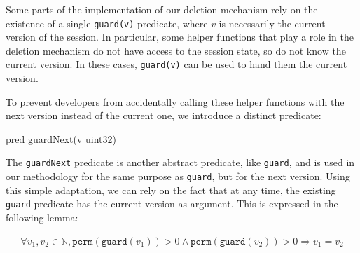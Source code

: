 Some parts of the implementation of our deletion mechanism rely on the existence of a single \texttt{guard(v)} predicate, where $v$ is necessarily the current version of the session.
In particular, some helper functions that play a role in the deletion mechanism do not have access to the session state, so do not know the current version.
In these cases, \texttt{guard(v)} can be used to hand them the current version.

To prevent developers from accidentally calling these helper functions with the next version instead of the current one, we introduce a distinct predicate:
\begin{gobra}
pred guardNext(v uint32)
\end{gobra}

The \texttt{guardNext} predicate is another abstract predicate, like \texttt{guard}, and is used in our methodology for the same purpose as \texttt{guard}, but for the next version. 
Using this simple adaptation, we can rely on the fact that at any time, the existing \texttt{guard} predicate has the current version as argument.
This is expressed in the following lemma:

\begin{lemma}\label{lem:unique-version}
    \begin{align*}
        \forall v_1, v_2 \in \mathbb{N}, \texttt{perm}(\texttt{guard}(v_1)) > 0 \land \texttt{perm}(\texttt{guard}(v_2)) > 0 \Rightarrow v_1 = v_2
    \end{align*}
\end{lemma}

